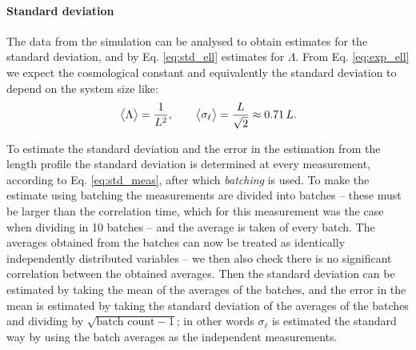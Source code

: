 \paragraph{Standard deviation}
The data from the simulation can be analysed to obtain estimates for the standard deviation, and by Eq. \eqref{eq:std_ell} estimates for $\Lambda$.
From Eq. \eqref{eq:exp_ell} we expect the cosmological constant and equivalently the standard deviation to depend on the system size like:
\begin{equation}\label{eq:std_theory}
    \big\langle \Lambda \big\rangle = \frac{1}{L^2}, \qquad \big\langle \sigma_\ell \big\rangle = \frac{L}{\sqrt{2}} \approx 0.71 \, L.
\end{equation}

To estimate the standard deviation and the error in the estimation from the length profile the standard deviation is determined at every measurement, according to Eq. \eqref{eq:std_meas}, after which \emph{batching} is used.
To make the estimate using batching the measurements are divided into batches -- these must be larger than the correlation time, which for this measurement was the case when dividing in 10 batches -- and the average is taken of every batch.
The averages obtained from the batches can now be treated as identically independently distributed variables -- we then also check there is no significant correlation between the obtained averages.
Then the standard deviation can be estimated by taking the mean of the averages of the batches, and the error in the mean is estimated by taking the standard deviation of the averages of the batches and dividing by $\sqrt{\text{batch count} - 1}$; in other words $\sigma_\ell$ is estimated the standard way by using the batch averages as the independent measurements.

